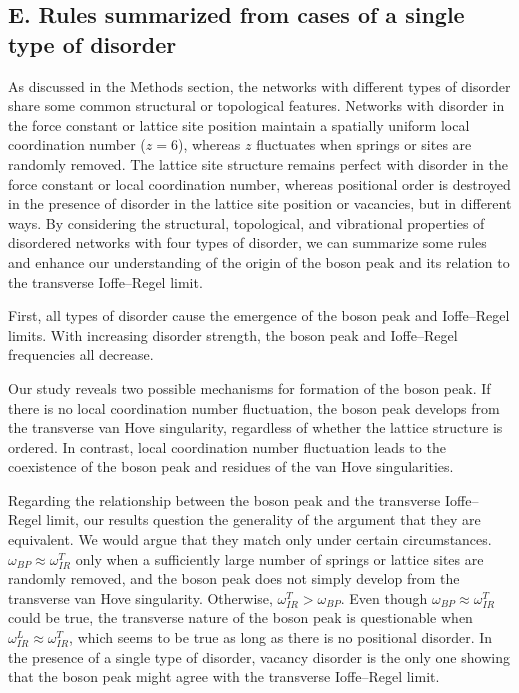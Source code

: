 \documentclass[twocolumn,printnumbers,amsmath,amssymb,prl,verbatim]{revtex4}
\begin{document}
\subsection{E. Rules summarized from cases of a single type of disorder}

As discussed in the Methods section, the networks with different types of disorder share some common structural or topological features. Networks with disorder in the force constant or lattice site position maintain a spatially uniform local coordination number ($z=6$), whereas $z$ fluctuates when springs or sites are randomly removed. The lattice site structure remains perfect with disorder in the force constant or local coordination number, whereas positional order is destroyed in the presence of disorder in the lattice site position or vacancies, but in different ways. By considering the structural, topological, and vibrational properties of disordered networks with four types of disorder, we can summarize some rules and enhance our understanding of the origin of the boson peak and its relation to the transverse Ioffe--Regel limit.

First, all types of disorder cause the emergence of the boson peak and Ioffe--Regel limits. With increasing disorder strength, the boson peak and Ioffe--Regel frequencies all decrease.

Our study reveals two possible mechanisms for formation of the boson peak. If there is no local coordination number fluctuation, the boson peak develops from the transverse van Hove singularity, regardless of whether the lattice structure is ordered. In contrast, local coordination number fluctuation leads to the coexistence of the boson peak and residues of the van Hove singularities.

Regarding the relationship between the boson peak and the transverse Ioffe--Regel limit, our results question the generality of the argument that they are equivalent. We would argue that they match only under certain circumstances. $\omega_{BP}\approx \omega_{IR}^T$ only when a sufficiently large number of springs or lattice sites are randomly removed, and the boson peak does not simply develop from the transverse van Hove singularity. Otherwise, $\omega_{IR}^T>\omega_{BP}$. Even though $\omega_{BP}\approx \omega_{IR}^T$ could be true, the transverse nature of the boson peak is questionable when $\omega_{IR}^L\approx \omega_{IR}^T$, which seems to be true as long as there is no positional disorder. In the presence of a single type of disorder, vacancy disorder is the only one showing that the boson peak might agree with the transverse Ioffe--Regel limit.
\end{document}
